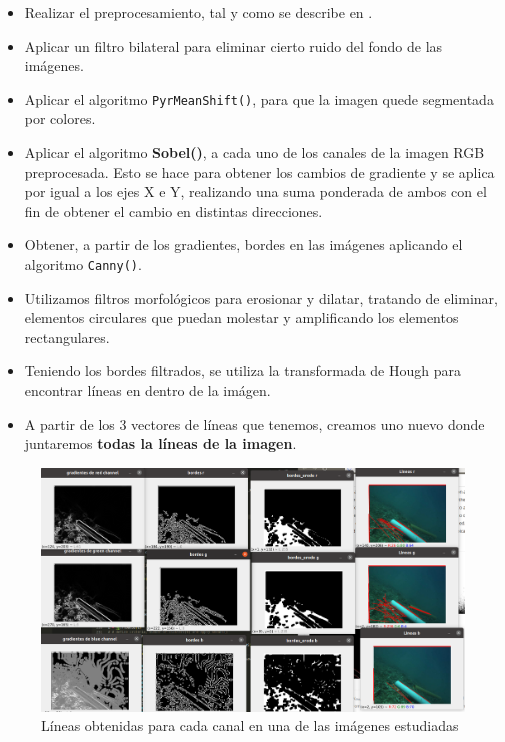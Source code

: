 \documentclass[12pt, a4paper]{article}
\begin{document}
\begin{itemize}
    
    \item Realizar el preprocesamiento, tal y como se describe en .
    
    \item Aplicar un filtro bilateral para eliminar cierto ruido del fondo de las imágenes.
    
    \item Aplicar el algoritmo \verb|PyrMeanShift()|, para que la imagen quede segmentada por colores.
    
    \item Aplicar el  algoritmo \textbf{Sobel()}, a cada uno de los canales de la imagen 
    RGB preprocesada. Esto se hace para obtener los cambios de gradiente y se aplica por igual 
    a los ejes X e Y, realizando una suma ponderada de ambos con el fin de obtener el 
    cambio en distintas direcciones. 

    \item Obtener, a partir de los gradientes, bordes en las imágenes aplicando el 
    algoritmo \verb|Canny()|.

    \item Utilizamos filtros morfológicos para erosionar y dilatar, tratando de eliminar,
    elementos circulares que puedan molestar y amplificando los elementos rectangulares.

    \item Teniendo los bordes filtrados, se utiliza la transformada de Hough para encontrar líneas en 
    dentro de la imágen.

    \item A partir de los 3 vectores de líneas que tenemos, creamos uno nuevo donde juntaremos
    \textbf{todas la líneas de la imagen}. 
    
\end{itemize}

\begin{figure}[H]
    \centering
    \includegraphics[scale=0.3]{sobel_canny_houghlines.png}
    \caption{Líneas obtenidas para cada canal en una de las imágenes estudiadas}
    \label{fig:sobelcanny}
\end{figure}
\end{document}
